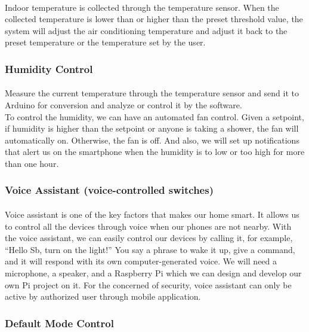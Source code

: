 \documentclass[a4paper,12pt]{article}
\begin{document}
\paragraph{}
Indoor temperature is collected through the temperature sensor. When the collected temperature is lower than or higher than the preset threshold value, the system will adjust the air conditioning temperature and adjust it back to the preset temperature or the temperature set by the user.

\subsubsection{Humidity Control}
\paragraph{}
Measure the current temperature through the temperature sensor and send it to Arduino for conversion and analyze or control it by the software. \\

To control the humidity, we can have an automated fan control. Given a setpoint, if humidity is higher than the setpoint or anyone is taking a shower, the fan will automatically on. Otherwise, the fan is off. And also, we will set up notifications that alert us on the smartphone when the humidity is to low or too high for more than one hour.

\subsubsection{Voice Assistant (voice-controlled switches)}
\paragraph{}
Voice assistant is one of the key factors that makes our home smart. It allows us to control all the devices through voice when our phones are not nearby. With the voice assistant, we can easily control our devices by calling it, for example, “Hello Sb, turn on the light!” You say a phrase to wake it up, give a command, and it will respond with its own computer-generated voice. We will need a microphone, a speaker, and a Raspberry Pi which we can design and develop our own Pi project on it. For the concerned of security, voice assistant can only be active by authorized user through mobile application.\\

\subsubsection{Default Mode Control}
\end{document}
